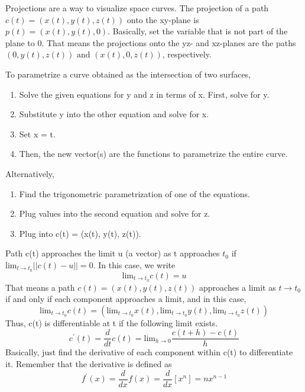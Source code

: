 \documentclass[12pt, letterpaper]{article}
\begin{document}
Projections are a way to visualize space curves. The projection of a path \(c(t) = (x(t), y(t), z(t))\) onto the xy-plane is \(p(t) = (x(t), y(t), 0)\). Basically, set the variable that is not part of the plane to 0. That means the projections onto the yz- and xz-planes are the paths \((0, y(t), z(t)) \text{ and }(x(t), 0, z(t))\), respectively.

To parametrize a curve obtained as the intersection of two surfaces,
\begin{enumerate}
    \item Solve the given equations for y and z in terms of x. First, solve for y.
    \item Substitute y into the other equation and solve for x.
    \item Set x = t.
    \item Then, the new vector(s) are the functions to parametrize the entire curve.
\end{enumerate}
Alternatively,
\begin{enumerate}
    \item Find the trigonometric parametrization of one of the equations. 
    \item Plug values into the second equation and solve for z.
    \item Plug into c(t) = (x(t), y(t), z(t)).
\end{enumerate}

Path c(t) approaches the limit u (a vector) as t approaches \(t_0\) if \(\text{lim}_{t \rightarrow t_0}||c(t) - u|| = 0\). In this case, we write 
\[
\text{lim}_{t \rightarrow t_0}c(t) = u    
\]
That means a path \(c(t) = (x(t), y(t), z(t))\) approaches a limit as \(t \rightarrow t_0\) if and only if each component approaches a limit, and in this case,
\[
\text{lim}_{t \rightarrow t_0}c(t) = (\text{lim}_{t \rightarrow t_0}x(t), \text{lim}_{t \rightarrow t_0}y(t), \text{lim}_{t \rightarrow t_0}z(t))    
\]
Thus, c(t) is differentiable at t if the following limit exists.
\[
c^{'}(t) = \frac{d}{dt}c(t) = \text{lim}_{h \rightarrow 0}\frac{c(t + h) - c(t)}{h}    
\]
Basically, just find the derivative of each component within c(t) to differentiate it. Remember that the derivative is defined as 
\[
f^{'}(x) = \frac{d}{dx}f(x) = \frac{d}{dx}[x^n] = nx^{n - 1}
\]
\end{document}
